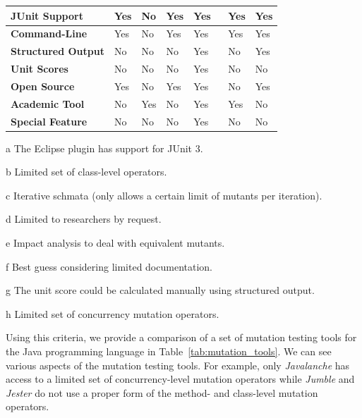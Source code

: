 \begin{table}
\begin{threeparttable}
\begin{tabular}{|l|l|l|l|l|l|l|}
      \hline \cellcolor[RGB]{169,196,223} \textbf{JUnit Support} & Yes & No\tnote{c} & Yes & Yes & Yes & Yes \\
      \hline \cellcolor[RGB]{169,196,223} \textbf{Command-Line} & Yes & No & Yes & Yes & Yes & Yes \\
      \hline \cellcolor[RGB]{169,196,223} \textbf{Structured Output} & No & No & No & Yes & No & Yes \\
      \hline \cellcolor[RGB]{169,196,223} \textbf{Unit Scores} & No & No & No & Yes & No & No\tnote{g} \\
      \hline \cellcolor[RGB]{169,196,223} \textbf{Open Source} & Yes & No\tnote{d} & Yes & Yes & No & Yes \\
      \hline \cellcolor[RGB]{169,196,223} \textbf{Academic Tool} & No & Yes & No & Yes & Yes & No \\
      \hline \cellcolor[RGB]{169,196,223} \textbf{Special Feature} & No & No & No & Yes~\tnote{e}~\tnote{h} & No & No \\
      \hline
    \end{tabular}
    \begin{tablenotes}
      \item[a] The Eclipse plugin has support for JUnit 3.
      \item[b] Limited set of class-level operators.
      \item[c] Iterative schmata (only allows a certain limit of mutants per iteration).
      \item[d] Limited to researchers by request.
      \item[e] Impact analysis to deal with equivalent mutants.
      \item[f] Best guess considering limited documentation.
      \item[g] The unit score could be calculated manually using structured output.
      \item[h] Limited set of concurrency mutation operators.
    \end{tablenotes}
  \end{threeparttable}
\end{table}
\afterpage\clearpage

Using this criteria, we provide a comparison of a set of mutation testing tools for the Java programming language in Table~\ref{tab:mutation_tools}. We can see various aspects of the mutation testing tools. For example, only \emph{Javalanche} has access to a limited set of concurrency-level mutation operators while \emph{Jumble} and \emph{Jester} do not use a proper form of the method- and class-level mutation operators.


